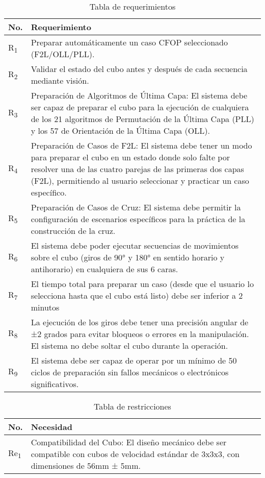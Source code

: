 \begin{table}[h]
    \scriptsize
	\centering
	\caption{Tabla de requerimientos}
	\begin{tabular}{p{10mm} p{120mm}} 
		\toprule
		\textbf{No.} & \textbf{Requerimiento} \\ \midrule
	 R\textsubscript{1}   &       Preparar automáticamente un caso CFOP seleccionado (F2L/OLL/PLL).     \\
  R\textsubscript{2}   &          Validar el estado del cubo antes y después de cada secuencia mediante visión.        \\
  R\textsubscript{3}   &          Preparación de Algoritmos de Última Capa: El sistema debe ser capaz de preparar el cubo para la ejecución de cualquiera de los 21 algoritmos de Permutación de la Última Capa (PLL) y los 57 de Orientación de la Última Capa (OLL).       \\
  R\textsubscript{4}   &          Preparación de Casos de F2L: El sistema debe tener un modo para preparar el cubo en un estado donde solo falte por resolver una de las cuatro parejas de las primeras dos capas (F2L), permitiendo al usuario seleccionar y practicar un caso específico.       \\
  R\textsubscript{5}   &          Preparación de Casos de Cruz: El sistema debe permitir la configuración de escenarios específicos para la práctica de la construcción de la cruz.       \\
  R\textsubscript{6}   &          El sistema debe poder ejecutar secuencias de movimientos sobre el cubo (giros de 90° y 180° en sentido horario y antihorario) en cualquiera de sus 6 caras.       \\
  R\textsubscript{7}   &          El tiempo total para preparar un caso (desde que el usuario lo selecciona hasta que el cubo está listo) debe ser inferior a 2 minutos       \\
  R\textsubscript{8}   &          La ejecución de los giros debe tener una precisión angular de ±2 grados para evitar bloqueos o errores en la manipulación. El sistema no debe soltar el cubo durante la operación.       \\
  R\textsubscript{9}   &          El sistema debe ser capaz de operar por un mínimo de 50 ciclos de preparación sin fallos mecánicos o electrónicos significativos.      \\ \bottomrule
	\end{tabular}
\end{table}
\FloatBarrier


\begin{table}[h]
	\centering
	\caption{Tabla de restricciones}
	\begin{tabular}{p{10mm} p{120mm}}
		\toprule
		\textbf{No.} & \textbf{Necesidad}  \\ \midrule
		Re\textsubscript{1} &   Compatibilidad del Cubo: El diseño mecánico debe ser compatible con cubos de velocidad estándar de 3x3x3, con dimensiones de 56mm ± 5mm.            \\
         \bottomrule
	\end{tabular}
\end{table}




